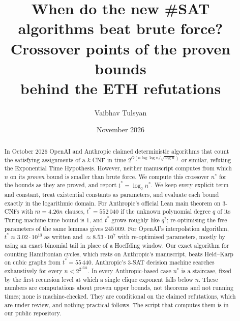 \documentclass[10pt]{amsart}
\theoremstyle{definition}
\theoremstyle{remark}
\numberwithin{equation}{section}
\newcommand{\tst}{t^{*}}
\newcommand{\nst}{n^{*}}
\begin{document}
\title[When do the new \#SAT algorithms beat brute force?]{When do the new \#SAT algorithms beat brute force?\\
Crossover points of the proven bounds\\ behind the ETH refutations}

\author{Vaibhav Tulsyan}

\date{November 2026}


\begin{abstract}
In October 2026 OpenAI and Anthropic claimed deterministic algorithms that count the satisfying
assignments of a $k$-CNF in time $2^{O(n\log\log n/\sqrt{\log n})}$ or similar, refuting the
Exponential Time Hypothesis. However, neither manuscript computes from which $n$ on its
\emph{proven} bound is smaller than brute force. We compute this crossover $\nst$ for the bounds as
they are proved, and report $\tst=\log_2\nst$. We keep every explicit term and constant, treat
existential constants as parameters, and evaluate each bound exactly in the logarithmic domain. For
Anthropic's official Lean main theorem on $3$-CNFs with $m=4.26n$ clauses, $\tst=552\,040$ if the
unknown polynomial degree $q$ of its Turing-machine time bound is $1$, and $\tst$ grows roughly like
$q^2$; re-optimising the free parameters of the same lemmas gives $245\,009$. For OpenAI's
interpolation algorithm, $\tst\approx3.02\cdot10^{13}$ as written and $\approx8.53\cdot10^{7}$ with
re-optimised parameters, mostly by using an exact binomial tail in place of a Hoeffding window. Our
exact algorithm for counting Hamiltonian cycles, which rests on Anthropic's manuscript, beats
Held--Karp on cubic graphs from $\tst=55\,440$. Anthropic's $3$-SAT decision machine searches
exhaustively for every $n<2^{2^{1722}}$. In every Anthropic-based case $\nst$ is a staircase, fixed by
the first recursion level at which a single clique exponent falls below $n$. These numbers are
computations about proven upper bounds, not theorems and not running times; none is machine-checked.
They are conditional on the claimed refutations, which are under review, and nothing practical
follows. The script that computes them is in our public repository.
\end{abstract}

\maketitle
\end{document}
